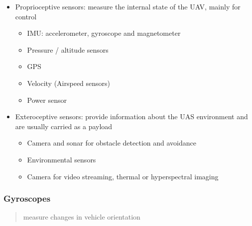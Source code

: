 \documentclass[]{article}
\begin{document}
\begin{itemize}
\item
  Proprioceptive sensors: measure the internal state of the UAV, mainly
  for control

  \begin{itemize}
  \item
    IMU: accelerometer, gyroscope and magnetometer
  \item
    Pressure / altitude sensors
  \item
    GPS
  \item
    Velocity (Airspeed sensors)
  \item
    Power sensor
  \end{itemize}
\item
  Exteroceptive sensors: provide information about the UAS environment
  and are usually carried as a payload

  \begin{itemize}
  \item
    Camera and sonar for obstacle detection and avoidance
  \item
    Environmental sensors
  \item
    Camera for video streaming, thermal or hyperspectral imaging
  \end{itemize}
\end{itemize}

\subsubsection{Gyroscopes}\label{header-n2179}

\begin{quote}
measure changes in vehicle orientation
\end{quote}
\end{document}
